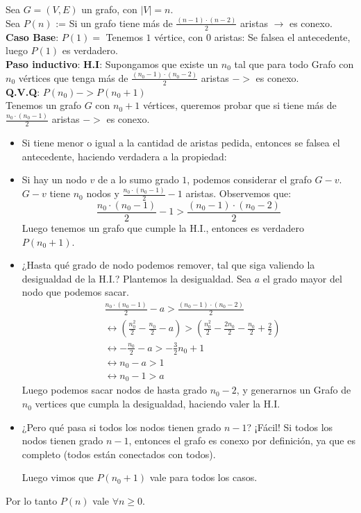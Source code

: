\documentclass{article}
\begin{document}
Sea $G = (V,E)$ un grafo, con $|V| = n$. \\
Sea $P(n)$ := Si un grafo tiene más de $\frac{(n-1) \cdot (n-2)}{2}$ aristas $\rightarrow$ es conexo. \\

\textbf{Caso Base}: $P(1) =$ Tenemos $1$ vértice, con $0$ aristas: Se falsea el antecedente, luego $P(1)$ es verdadero. \\

\textbf{Paso inductivo}: \textbf{H.I}: Supongamos que existe un $n_0$ tal que para todo Grafo con $n_0$ vértices que tenga más de $\frac{(n_0 - 1) \cdot (n_0 - 2)}{2}$ aristas $->$ es conexo. \\

\textbf{Q.V.Q}: $P(n_0) -> P(n_0  + 1)$ \\

Tenemos un grafo $G$ con $n_0 + 1$ vértices, queremos probar que si tiene más de $\frac{n_0 \cdot (n_0-1)}{2}$ aristas $->$ es conexo.
\begin{itemize}

	\item Si tiene menor o igual a la cantidad de aristas pedida, entonces se falsea el antecedente, haciendo verdadera a la propiedad:

    \item Si hay un nodo $v$ de a lo sumo grado $1$, podemos considerar el grafo $G-v$. $G-v$ tiene $n_0$ nodos y $\frac{n_0 \cdot (n_0 -1)}{2}  - 1$ aristas. Observemos que: 
    $$\frac{n_0 \cdot (n_0 -1)}{2}  - 1 > \frac{(n_0-1) \cdot (n_0-2)}{2}$$ 
    Luego tenemos un grafo que cumple la H.I., entonces es verdadero $P(n_0 + 1)$.
    
    \item ¿Hasta qué grado de nodo podemos remover, tal que siga valiendo la desigualdad de la H.I.? Plantemos la desigualdad. Sea $a$ el grado mayor del nodo que podemos sacar.
    \begin{align*}
        &\frac{n_0 \cdot (n_0 -1)}{2}  - a > \frac{(n_0-1) \cdot (n_0-2)}{2} \\
        &\leftrightarrow \left(\frac{n_0^2}{2} -\frac{n_0}{2} - a\right) > \left(\frac{n_0^2}{2} - \frac{2n_0}{2} - \frac{n_0}{2} + \frac{2}{2}\right) \\
        &\leftrightarrow -\frac{n_0}{2}  -a > - \frac{3}{2}n_0 + 1 \\
        &\leftrightarrow n_0 - a > 1 \\
        &\leftrightarrow n_0 - 1 > a
    \end{align*}
   Luego podemos sacar nodos de hasta grado $n_0 - 2$, y generarnos un Grafo de $n_0$ vertices que  cumpla la desigualdad,  haciendo valer la H.I. \\\item ¿Pero qué pasa si todos los nodos tienen grado $n-1$? 
   ¡Fácil! Si todos los nodos tienen grado $n -1$, entonces el grafo es conexo por definición, ya que es completo (todos están conectados con todos).
    
    Luego vimos que $P(n_0 +1)$ vale para todos los casos.
\end{itemize}

Por lo tanto $P(n)$ vale $\forall n \geq 0$.
\end{document}
